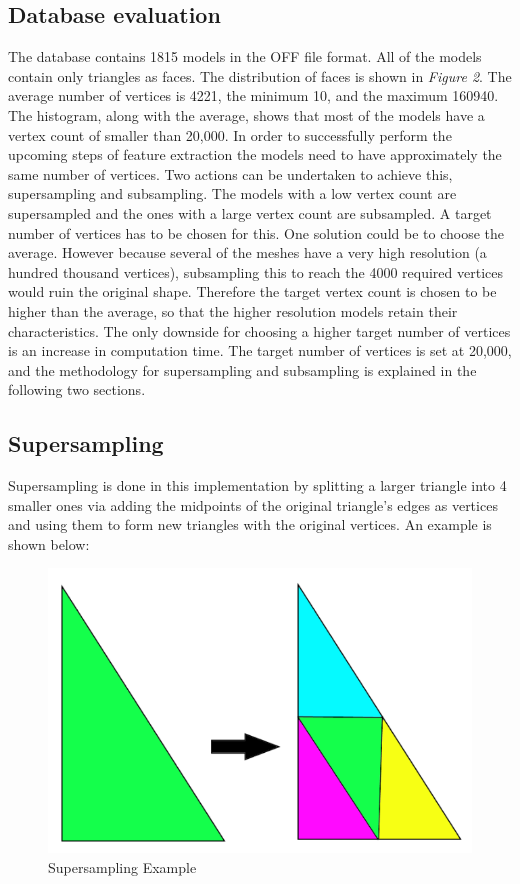 \documentclass{bigdata}
\begin{document}
\subsection{Database evaluation}

The database contains 1815 models in the OFF file format. All of the models contain only triangles as faces. The distribution of faces is shown in \textit{Figure 2}. The average number of vertices is 4221, the minimum 10, and the maximum 160940. The histogram, along with the average, shows that most of the models have a vertex count of smaller than 20,000. In order to successfully perform the upcoming steps of feature extraction the models need to have approximately the same number of vertices. Two actions can be undertaken to achieve this, supersampling and subsampling. The models with a low vertex count are supersampled and the ones with a large vertex count are subsampled. A target number of vertices has to be chosen for this. One solution could be to choose the average. However because several of the meshes have a very high resolution (a hundred thousand vertices), subsampling this to reach the 4000 required vertices would ruin the original shape. Therefore the target vertex count is chosen to be higher than the average, so that the higher resolution models retain their characteristics. The only downside for choosing a higher target number of vertices is an increase in computation time. The target number of vertices is set at 20,000, and the methodology for supersampling and subsampling is explained in the following two sections.

\subsection{Supersampling}
Supersampling is done in this implementation by splitting a larger triangle into 4 smaller ones via adding the midpoints of the original triangle’s edges as vertices and using them to form new triangles with the original vertices. An example is shown below:

\begin{figure}[h!]
  \centering
  \includegraphics[width=0.5\linewidth]{Pictures/triangle.png}
  \caption{Supersampling Example}
\end{figure}
\end{document}
